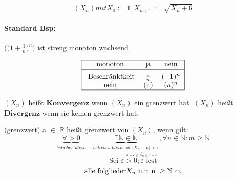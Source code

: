 \begin{example}


    \[	(X_n) mit X_0 := 1 , X_{n+1} := \sqrt{X_n +6} \]
    \paragraph{Standard Bsp:}
    $ \big( \big(1+ \frac{1}{n} \big)^n \big) $ ist streng monoton wachsend
\end{example}
\begin{remark}

    \[
        \begin{tabular}{|c| c c |}
            \hline
            monoton & ja & nein  \\
            \hline
            \rule{0pt}{3ex}
            Beschränktkeit & $\frac{1}{n}$ & $(-1)^n$ \\
            nein & (n) & $(n)^n$ \\
            \hline
        \end{tabular}
    \]

\end{remark}
\begin{definition}
    $(X_n)$ heißt $\boldsymbol{Konvergenz}$ wenn $(X_n)$ ein grenzwert hat.
    $(X_n)$ heißt $\boldsymbol{Divergrnz}$ wenn sie keinen grenzwert hat.
\end{definition}
\begin{definition}(grenzwert)
a $\in$ $\mathbb{R}$ heißt grenzwert von $(X_n)$, wenn gilt:
\[ \underbrace{\forall > 0 }_{beliebes \; klein} \quad \underbrace{\exists \mathbb{N} \in \mathbb{N}}_{beliebes \;  klein \; \underbrace{\Rightarrow |X_n -a|< \varepsilon}_{a- \varepsilon \leq X_n \leq a+\varepsilon } } , \forall n \in \mathbb{N} : m \geq \mathbb{N}  \]
\[ \text{Sei  } \varepsilon > 0 ; \varepsilon \text{  fest} \]
\[ \text{alle folglieder$ X_n$ mit n } \geq \mathbb{N} \curvearrowright \]
%


\end{definition}

